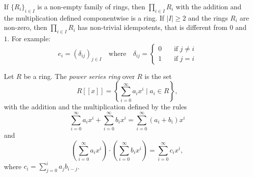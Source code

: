 %


\begin{example}
If $\{ R_i\} _{i\in I}$ is a non-empty family of rings, then
$\prod_{i\in I}R_i$ with the addition and the multiplication defined componentwise is a ring. If $|I|\geq 2$ and the rings $R_i$ are non-zero, then $\prod_{i\in I}R_i$ has non-trivial idempotents, that is different from $0$ and $1$. For example:
$$e_i=(\delta _{ij})_{j\in I}\quad\mbox{where}\quad\delta_{ij}=\left\{\begin{array}{ll}
0&\quad\mbox{if}\; j\neq i\\
1&\quad\mbox{if}\; j=i\end{array}\right. $$
\end{example}

\begin{example}
	Let $R$ be a ring. The {\em power series ring} over $R$ is the set
	$$R[[x]]=\left\{ \sum_{i=0}^{\infty}a_ix^{i}\mid a_{i}\in R\right\},
	$$
	with the addition and the multiplication defined by the rules
	$$\sum_{i=0}^{\infty}a_ix^{i} +\sum_{i=0}^{\infty}b_ix^{i}=\sum_{i=0}^{\infty}(a_i+b_i)x^{i}$$
	and
	$$\left(\sum_{i=0}^{\infty}a_ix^{i}\right)\cdot\left( \sum_{i=0}^{\infty}b_ix^{i}\right)=\sum_{i=0}^{\infty}c_ix^{i},$$
	where $c_i=\sum_{j=0}^{i}a_jb_{i-j}$.
\end{example}
	
